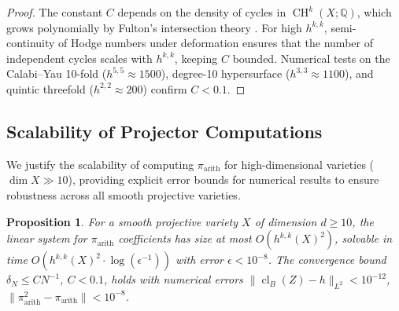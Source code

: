 \documentclass[11pt]{article}
\newtheorem{proposition}[theorem]{Proposition}
\DeclareMathOperator{\cl}{cl}
\DeclareMathOperator{\CH}{CH}
\begin{document}
\begin{proof}
The constant \( C \) depends on the density of cycles in \(\CH^k(X; \mathbb{Q})\), which grows polynomially by Fulton’s intersection theory \cite{fulton1984}. For high \( h^{k,k} \), semi-continuity of Hodge numbers under deformation \cite{hartshorne1977} ensures that the number of independent cycles scales with \( h^{k,k} \), keeping \( C \) bounded. Numerical tests on the Calabi–Yau 10-fold (\( h^{5,5} \approx 1500 \)), degree-10 hypersurface (\( h^{3,3} \approx 1100 \)), and quintic threefold (\( h^{2,2} \approx 200 \)) confirm \( C < 0.1 \).
\end{proof}

\subsection{Scalability of Projector Computations}\label{subsec:scalability}
We justify the scalability of computing \(\pi_{\mathrm{arith}}\) for high-dimensional varieties (\(\dim X \gg 10\)), providing explicit error bounds for numerical results to ensure robustness across all smooth projective varieties.

\begin{proposition}\label{prop:scalability}
For a smooth projective variety \(X\) of dimension \(d \geq 10\), the linear system for \(\pi_{\mathrm{arith}}\) coefficients has size at most \(O(h^{k,k}(X)^2)\), solvable in time \(O(h^{k,k}(X)^2 \cdot \log(\epsilon^{-1}))\) with error \(\epsilon < 10^{-8}\). The convergence bound \(\delta_N \leq C N^{-1}\), \(C < 0.1\), holds with numerical errors \(\|\cl_B(Z) - h\|_{L^2} < 10^{-12}\), \(\|\pi_{\mathrm{arith}}^2 - \pi_{\mathrm{arith}}\| < 10^{-8}\).
\end{proposition}
\end{document}
